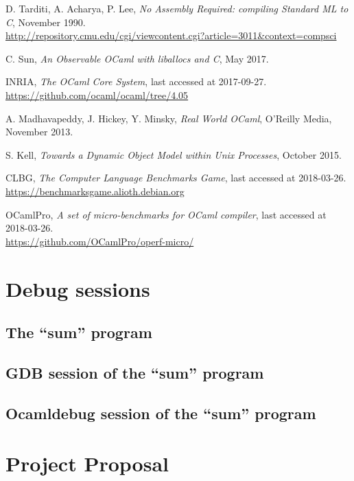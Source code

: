 \documentclass[12pt,a4paper,twoside,openright]{report}
\begin{document}

\begin{thebibliography}{9}

D. Tarditi, A. Acharya, P. Lee,
\textit{No Assembly Required: compiling Standard ML to C},
November 1990.\\
\url{http://repository.cmu.edu/cgi/viewcontent.cgi?article=3011&context=compsci}

C. Sun,
\textit{An Observable OCaml with liballocs and C},
May 2017.

INRIA,
\textit{The OCaml Core System},
last accessed at 2017-09-27.\\
\url{https://github.com/ocaml/ocaml/tree/4.05}

A. Madhavapeddy, J. Hickey, Y. Minsky,
\textit{Real World OCaml},
O'Reilly Media,
November 2013.

S. Kell,
\textit{Towards a Dynamic Object Model within Unix Processes},
October 2015.

CLBG,
\textit{The Computer Language Benchmarks Game},
last accessed at 2018-03-26.\\
\url{https://benchmarksgame.alioth.debian.org}

OCamlPro,
\textit{A set of micro-benchmarks for OCaml compiler},
last accessed at 2018-03-26.\\
\url{https://github.com/OCamlPro/operf-micro/}

\end{thebibliography}

\appendix

\chapter{Debug sessions} \label{app:debug-sessions}

\section{The ``sum'' program}



\section{GDB session of the ``sum'' program} \label{app:debug-gdb}



\section{Ocamldebug session of the ``sum'' program} \label{app:debug-ocaml}



\chapter{Project Proposal}


\end{document}
